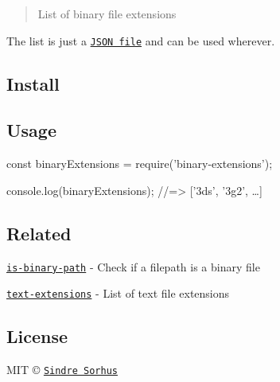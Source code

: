 \begin{quote}
List of binary file extensions \end{quote}


The list is just a \href{binary-extensions.json}{\tt J\+S\+ON file} and can be used wherever.

\subsection*{Install}




\subsection*{Usage}


\begin{DoxyCode}
const binaryExtensions = require('binary-extensions');

console.log(binaryExtensions);
//=> ['3ds', '3g2', …]
\end{DoxyCode}


\subsection*{Related}


\begin{DoxyItemize}
\item \href{https://github.com/sindresorhus/is-binary-path}{\tt is-\/binary-\/path} -\/ Check if a filepath is a binary file
\item \href{https://github.com/sindresorhus/text-extensions}{\tt text-\/extensions} -\/ List of text file extensions
\end{DoxyItemize}

\subsection*{License}

M\+IT © \href{https://sindresorhus.com}{\tt Sindre Sorhus} 